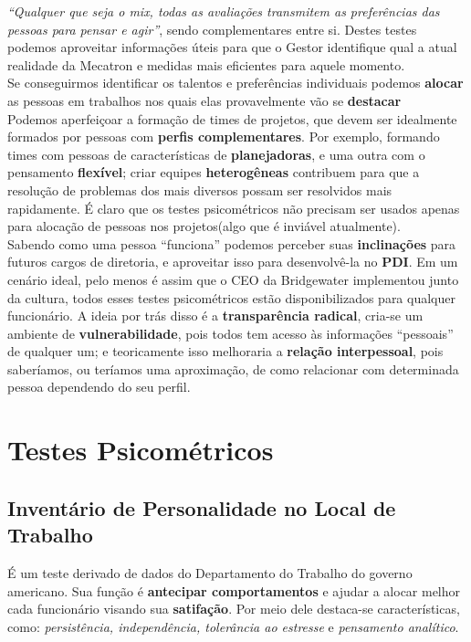 \documentclass[a4paper, 12pt]{article}
\begin{document}
\textit{“Qualquer que seja o mix, todas as avaliações transmitem as preferências das pessoas para pensar e agir”}, sendo complementares entre si.
Destes testes podemos aproveitar informações úteis para que o Gestor identifique qual a atual realidade da Mecatron e medidas mais eficientes para aquele momento. \\

Se conseguirmos identificar os talentos e preferências individuais podemos \textbf{alocar} as pessoas em trabalhos nos quais elas provavelmente vão se \textbf{destacar}\\

Podemos aperfeiçoar a formação de times de projetos, que devem ser idealmente formados por pessoas com \textbf{perfis complementares}. Por exemplo, formando times com pessoas de características de \textbf{planejadoras}, e uma outra com o pensamento \textbf{flexível}; criar equipes \textbf{heterogêneas} contribuem para que a resolução de problemas dos mais diversos possam ser resolvidos mais rapidamente.
É claro que os testes psicométricos não precisam ser usados apenas para alocação de pessoas nos projetos(algo que é inviável atualmente). \\

Sabendo como uma pessoa “funciona” podemos perceber suas \textbf{inclinações} para futuros cargos de diretoria, e aproveitar isso para desenvolvê-la no \textbf{PDI}.
Em um cenário ideal, pelo menos é assim que o CEO da Bridgewater implementou junto da cultura, todos esses testes psicométricos estão disponibilizados para qualquer funcionário. A ideia por trás disso é a \textbf{transparência radical}, cria-se um ambiente de \textbf{vulnerabilidade}, pois todos tem acesso às informações “pessoais” de qualquer um; e teoricamente isso melhoraria a \textbf{relação interpessoal}, pois saberíamos, ou teríamos uma aproximação, de como relacionar com determinada pessoa dependendo do seu perfil.

\section{Testes Psicométricos}
\subsection{Inventário de Personalidade no Local de Trabalho}
É um teste derivado de dados do Departamento do Trabalho do governo americano. Sua função é \textbf{antecipar comportamentos} e ajudar a alocar melhor cada funcionário visando sua \textbf{satifação}. Por meio dele destaca-se características, como: \textit{persistência, independência, tolerância ao estresse} e \textit{pensamento analítico}.\\
\end{document}
